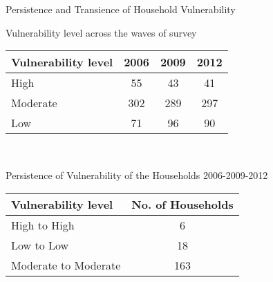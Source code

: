 \documentclass{beamer}
\begin{document}
	\begin{frame}{Persistence and Transience of Household Vulnerability}
		\begin{exampleblock}{Vulnerability level across the waves of survey}
			\begin{table}[H]
				\begin{center}
					\begin{tabular}{lccc} \hline
						\textbf{Vulnerability level} & \textbf{2006}            & \textbf{2009}            & \textbf{2012}           \\ \hline
						High                         & 55                       & 43                       & 41                      \\
						Moderate                     & 302                      & 289                      & 297                     \\
						Low                          & 71                       & 96                       & 90                \\ \hline \hline     
					\end{tabular}\\
				\end{center}
			\end{table}
		\end{exampleblock}
		
		\begin{alertblock}{Persistence of Vulnerability of the Households 2006-2009-2012}
			\begin{table}[H]
				\begin{center}
					\begin{tabular}{lc} \hline
						\textbf{Vulnerability level} & \textbf{No. of Households} \\	\hline
						High to High & 6 \\
						Low to Low            & 18         \\
						Moderate to Moderate  & 163  \\ \hline \hline     
					\end{tabular} \\
				\end{center}
			\end{table}
		\end{alertblock}
	\end{frame}
	
\end{document}
